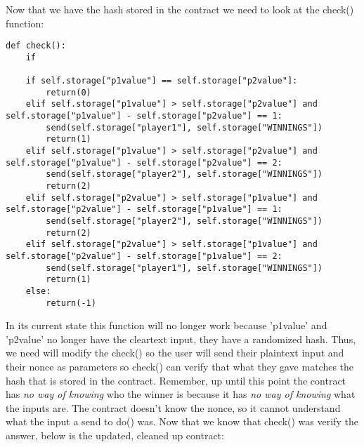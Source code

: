 \documentclass[12pt]{article}
\begin{document}
Now that we have the hash stored in the contract we need to look at the check() function:

\begin{lstlisting}
def check():
	if

	if self.storage["p1value"] == self.storage["p2value"]:
		return(0)
	elif self.storage["p1value"] > self.storage["p2value"] and self.storage["p1value"] - self.storage["p2value"] == 1:
		send(self.storage["player1"], self.storage["WINNINGS"]) 
		return(1)
	elif self.storage["p1value"] > self.storage["p2value"] and self.storage["p1value"] - self.storage["p2value"] == 2:
		send(self.storage["player2"], self.storage["WINNINGS"])
		return(2)
	elif self.storage["p2value"] > self.storage["p1value"] and self.storage["p2value"] - self.storage["p1value"] == 1:
		send(self.storage["player2"], self.storage["WINNINGS"])		
		return(2)
	elif self.storage["p2value"] > self.storage["p1value"] and self.storage["p2value"] - self.storage["p1value"] == 2:
		send(self.storage["player1"], self.storage["WINNINGS"])		
		return(1)
	else:
		return(-1)
\end{lstlisting}

In its current state this function will no longer work because 'p1value' and 'p2value' no longer have the cleartext input, they have a randomized hash. Thus, we need will modify the check() so the user will send their plaintext input and their nonce as parameters so check() can verify that what they gave matches the hash that is stored in the contract. Remember, up until this point the contract has \textit{no way of knowing} who the winner is because it has \textit{no way of knowing} what the inputs are. The contract doesn't know the nonce, so it cannot understand what the input a send to do() was. Now that we know that check() was verify the answer, below is the updated, cleaned up contract:
\end{document}
